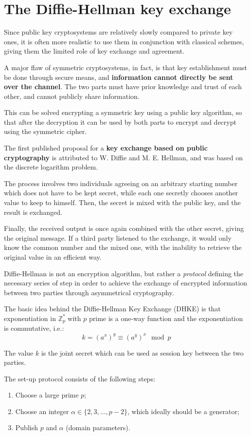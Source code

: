 \section{The Diffie-Hellman key exchange}
Since public key cryptosystems are relatively slowly compared to private key ones, it is often more realistic to use them in conjunction with classical schemes, giving them the limited role of key exchange and agreement.

A major flaw of symmetric cryptosystems, in fact, is that key establishment must be done through secure means, and \textbf{information cannot directly be sent over the channel}. The two parts must have prior knowledge and trust of each other, and cannot publicly share information. 

This can be solved encrypting a symmetric key using a public key algorithm, so that after the decryption it can be used by both parts to encrypt and decrypt using the symmetric cipher. 

The first published proposal for a \textbf{key exchange based on public cryptography} is attributed to W. Diffie and M. E. Hellman, and was based on the discrete logarithm problem.

The process involves two individuals agreeing on an arbitrary starting number which does not have to be kept secret, while each one secretly chooses another value to keep to himself. Then, the secret is mixed with the public key, and the result is exchanged. 

Finally, the received output is once again combined with the other secret, giving the original message. If a third party listened to the exchange, it would only know the common number and the mixed one, with the inability to retrieve the original value in an efficient way.

Diffie-Hellman is not an encryption algorithm, but rather a \textit{protocol} defining the necessary series of step in order to achieve the exchange of encrypted information between two parties through asymmetrical cryptography. 

The basic idea behind the Diffie-Hellman Key Exchange (DHKE) is that exponentiation in $\mathbb{Z}^*_p$ with $p$ prime is a one-way function and the exponentiation is commutative, i.e.:
$$k = (a^x)^y \equiv (a^y)^x \mod p$$

The value $k$ is the joint secret which can be used as session key between the two parties. 

The set-up protocol consists of the following steps:
\begin{enumerate}
	\item Choose a large prime $p$;
	\item Choose an integer $\alpha \in \{2, 3, \dots, p - 2\}$, which ideally should be a generator;
	\item Publish $p$ and $\alpha$ (domain parameters).
\end{enumerate}

